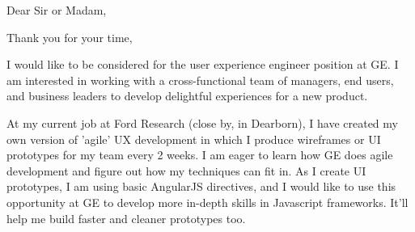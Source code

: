 \documentclass[10pt,a4paper,sans]{moderncv}        %
\begin{document}





\clearpage
\date{October 10, 2014}
\opening{Dear Sir or Madam,}
\closing{Thank you for your time,}
\makelettertitle

I would like to be considered for the user experience engineer position at GE.  I am interested in working with a cross-functional team of managers, end users, and business leaders to develop delightful experiences for a new product.  

At my current job at Ford Research (close by, in Dearborn), I have created my own version of 'agile' UX development in which I produce wireframes or UI prototypes for my team every 2 weeks.  I am eager to learn how GE does agile development and figure out how my techniques can fit in.  As I create UI prototypes, I am using basic AngularJS directives, and I would like to use this opportunity at GE to develop more in-depth skills in Javascript frameworks. It'll help me build faster and cleaner prototypes too.  
\smallskip
\end{document}
